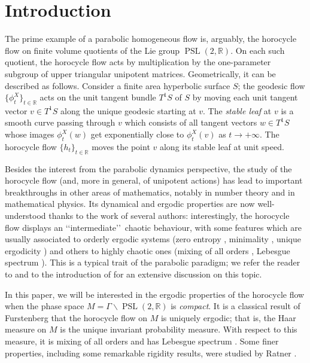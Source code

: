 \documentclass[JEP,XML,SOM,NoEqCountersInSection,Unicode,published]{cedram}
\newcommand \R{\mathbb{R}}
\DeclareMathOperator{\PSL}{PSL}
\theoremstyle{definition}
\begin{document}
\maketitle
{\let\footnotemark\relax\tableofcontents}


\section{Introduction}\label{sec:introduction}

The prime example of a parabolic homogeneous flow is, arguably, the horocycle flow on finite volume quotients of the Lie group $\PSL(2,\R)$.
On each such quotient, the horocycle flow acts by multiplication by the one-parameter subgroup of upper triangular unipotent matrices.
Geometrically, it can be described as follows. Consider a finite area hyperbolic surface $S$; the geodesic flow $\{ \phi^X_t\}_{t \in \R}$ acts on the unit tangent bundle $T^1S$ of $S$ by moving each unit tangent vector $v \in T^1S$ along the unique geodesic starting at $v$. The \emph{stable leaf} at $v$ is a smooth curve passing through $v$ which consists of all tangent vectors $w \in T^1S$ whose images $\phi^X_t(w)$ get exponentially close to $\phi^X_t(v)$ as $t \to +\infty$. The horocycle flow $\{h_t\}_{t \in \R}$ moves the point $v$ along its stable leaf at unit speed.\enlargethispage{\baselineskip}

Besides the interest from the parabolic dynamics perspective, the study of the horocycle flow (and, more in general, of unipotent actions) has lead to important breakthroughs in other areas of mathematics, notably in number theory and in mathematical physics.
Its dynamical and ergodic properties are now well-understood thanks to the work of several authors: interestingly, the horocycle flow displays an \lq\lq intermediate\rq\rq\ chaotic behaviour, with some features which are usually associated to orderly ergodic systems (zero entropy \cite{Gur}, minimality \cite{Hed}, unique ergodicity \cite{Fur}) and others to highly chaotic ones (mixing of all orders \cite{Mar}, Lebesgue spectrum \cite{Par}). This is a typical trait of the parabolic paradigm; we refer the reader to \cite[Chap.\,8]{HasKat} and to the introduction of \cite{AFRU} for an extensive discussion on this topic.

In this paper, we will be interested in the ergodic properties of the horocycle flow when the phase space $M = \Gamma \backslash \PSL(2,\R)$ is \emph{compact}.
It is a classical result of Furstenberg \cite{Fur} that the horocycle flow on $M$ is uniquely ergodic; that is, the Haar measure on $M$ is the unique invariant probability measure.
With respect to this measure, it is mixing of all orders \cite{Mar} and has Lebesgue spectrum \cite{GeFo, Par}.
Some finer properties, including some remarkable rigidity results, were studied by Ratner \cite{Rat2, Rat4, Rat3}.
\end{document}
